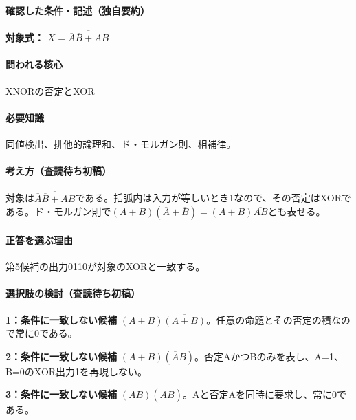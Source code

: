 \paragraph{確認した条件・記述（独自要約）}\mbox{}\par

\noindent\textbf{対象式：} \(X=\overline{\overline A\overline B+AB}\)\par

\paragraph{問われる核心} XNORの否定とXOR

\paragraph{必要知識} 同値検出、排他的論理和、ド・モルガン則、相補律。

\paragraph{考え方（査読待ち初稿）} 対象は\(\overline{\overline A\overline B+AB}\)である。括弧内は入力が等しいとき1なので、その否定はXORである。ド・モルガン則で\((A+B)(\overline A+\overline B)=(A+B)\overline{AB}\)とも表せる。

\paragraph{正答を選ぶ理由} 第5候補の出力0110が対象のXORと一致する。

\paragraph{選択肢の検討（査読待ち初稿）}\mbox{}\par

\noindent\textbf{1：条件に一致しない候補} \((A+B)\overline{(A+B)}\)。任意の命題とその否定の積なので常に0である。\par

\noindent\textbf{2：条件に一致しない候補} \((A+B)(\overline A B)\)。否定AかつBのみを表し、A=\allowbreak{}1、B=\allowbreak{}0のXOR出力1を再現しない。\par

\noindent\textbf{3：条件に一致しない候補} \((AB)(\overline A\overline B)\)。Aと否定Aを同時に要求し、常に0である。\par

